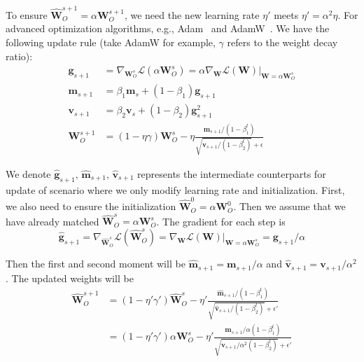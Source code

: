 \documentclass{article} \usepackage{iclr2025_conference,times}
\begin{document}
 To ensure $\hat{\boldsymbol{W}}_O^{s+1}=\alpha\boldsymbol{W}_O^{s+1}$, we need the new learning rate $\eta'$ meets $\eta'=\alpha^2\eta$. For advanced optimization algorithms, e.g., Adam~\citep{kingma2014adam} and AdamW~\citep{loshchilov2017decoupled}. We have the following update rule (take AdamW for example, $\gamma$ refers to the weight decay ratio): 
 \begin{align}
\boldsymbol{g}_{s+1} &= \nabla_{\boldsymbol{W}_O^{s}} \mathcal{L}(\alpha\boldsymbol{W}_O^{s}) = \alpha\nabla_{\boldsymbol{W}} \mathcal{L}(\boldsymbol{W})|_{\boldsymbol{W}=\alpha\boldsymbol{W}_O^{s}} \\
\boldsymbol{m}_{s+1} &= \beta_1\boldsymbol{m}_{s} + (1-\beta_1)\boldsymbol{g}_{s+1} \\
\boldsymbol{v}_{s+1} &= \beta_2\boldsymbol{v}_{s} + (1-\beta_2)\boldsymbol{g}^2_{s+1} \\
\boldsymbol{W}_O^{s+1}&=(1-\eta\gamma) \boldsymbol{W}_O^{s} - \eta \frac{\boldsymbol{m}_{s+1} / (1 - \beta_1^t)}{\sqrt{\boldsymbol{v}_{s+1}/ (1-\beta_2^t)} + \epsilon}
\end{align}

We denote $\hat{\boldsymbol{g}}_{s+1},\,\hat{\boldsymbol{m}}_{s+1},\,\hat{\boldsymbol{v}}_{s+1}$ represents the intermediate counterparts for update of scenario where we only modify learning rate and initialization. First, we also need to ensure the initialization $\hat{\boldsymbol{W}}_O^{0}=\alpha\boldsymbol{W}_O^{0}$. Then we assume that we have already matched $\hat{\boldsymbol{W}}_O^{s}=\alpha\boldsymbol{W}_O^{s}$. The gradient for each step is
\begin{equation}
    \hat{\boldsymbol{g}}_{s+1} = \nabla_{\hat{\boldsymbol{W}}_O^{s}} \mathcal{L}(\hat{\boldsymbol{W}}_O^{s}) = \nabla_{\boldsymbol{W}} \mathcal{L}(\boldsymbol{W})|_{\boldsymbol{W}=\alpha\boldsymbol{W}_O^{s}}= \boldsymbol{g}_{s+1} / \alpha
\end{equation}

Then the first and second moment will be $\hat{\boldsymbol{m}}_{s+1}=\boldsymbol{m}_{s+1} / \alpha$ and  $\hat{\boldsymbol{v}}_{s+1}=\boldsymbol{v}_{s+1} / \alpha^2$. The updated weights will be 
\begin{align}
\hat{\boldsymbol{W}}_O^{s+1}&=(1-\eta'\gamma') \hat{\boldsymbol{W}}_O^{s} - \eta' \frac{\hat{\boldsymbol{m}}_{s+1} / (1 - \beta_1^t)}{\sqrt{\hat{\boldsymbol{v}}_{s+1}/ (1-\beta_2^t)} + \epsilon'}\\    
&=(1-\eta'\gamma') \alpha\boldsymbol{W}_O^{s} - \eta' \frac{\boldsymbol{m}_{s+1} /\alpha(1 - \beta_1^t)}{\sqrt{\boldsymbol{v}_{s+1}/ \alpha^2(1-\beta_2^t)} + \epsilon'} 
\end{align}
\end{document}
